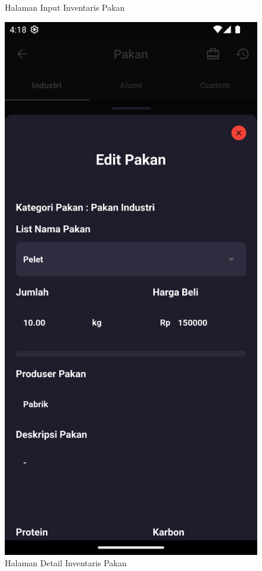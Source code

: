 \begin{spacing}{1.5}
\begin{enumerate}
\begin{enumerate}
\begin{itemize}
\begin{figure}[H]
						\caption{Halaman Input Inventaris Pakan}
					\endminipage\hfill
						\includegraphics[width=\linewidth]{gambar/sprint4/detail_inv_pakan.png}
						\caption{Halaman Detail Inventaris Pakan}
					\endminipage\hfill
				\end{figure}


\end{itemize}
\end{enumerate}
\end{enumerate}
\end{spacing}

